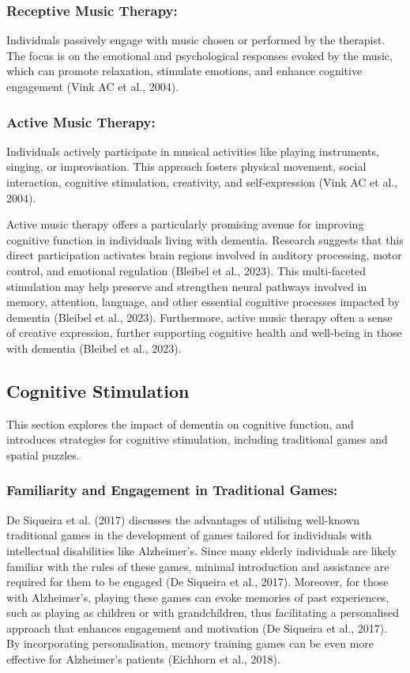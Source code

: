 \documentclass{l4proj}
\begin{document}
\subsubsection{Receptive Music Therapy:} Individuals passively engage with music chosen or performed by the therapist. The focus is on the emotional and psychological responses evoked by the music, which can promote relaxation, stimulate emotions, and enhance cognitive engagement (Vink AC et al., 2004).

\subsubsection{Active Music Therapy:} Individuals actively participate in musical activities like playing instruments, singing, or improvisation.  This approach fosters physical movement, social interaction, cognitive stimulation, creativity, and self-expression (Vink AC et al., 2004).

Active music therapy offers a particularly promising avenue for improving cognitive function in individuals living with dementia. Research suggests that this direct participation activates brain regions involved in auditory processing, motor control, and emotional regulation (Bleibel et al., 2023). This multi-faceted stimulation may help preserve and strengthen neural pathways involved in memory, attention, language, and other essential cognitive processes impacted by dementia (Bleibel et al., 2023).  Furthermore, active music therapy often a sense of creative expression, further supporting cognitive health and well-being in those with dementia (Bleibel et al., 2023).

\subsection{Cognitive Stimulation}
This section explores the impact of dementia on cognitive function, and introduces strategies for cognitive stimulation, including traditional games and spatial puzzles.

\subsubsection{Familiarity and Engagement in Traditional Games:}\label{sec:traditional_games}
De Siqueira et al. (2017) discusses the advantages of utilising well-known traditional games in the development of games tailored for individuals with intellectual disabilities like Alzheimer's. Since many elderly individuals are likely familiar with the rules of these games, minimal introduction and assistance are required for them to be engaged (De Siqueira et al., 2017). Moreover, for those with Alzheimer's, playing these games can evoke memories of past experiences, such as playing as children or with grandchildren, thus facilitating a personalised approach that enhances engagement and motivation (De Siqueira et al., 2017). By incorporating personalisation, memory training games can be even more effective for Alzheimer's patients (Eichhorn et al., 2018). \newline
\end{document}
